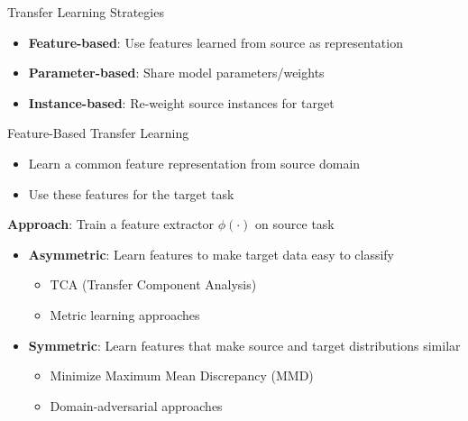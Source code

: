 \documentclass[11pt]{beamer}
\begin{document}
\begin{frame}{Transfer Learning Strategies}
    \centering
    \vfill
    \begin{itemize}
        \item \textbf{Feature-based}: Use features learned from source as representation
        \item \textbf{Parameter-based}: Share model parameters/weights
        \item \textbf{Instance-based}: Re-weight source instances for target
    \end{itemize}
\end{frame}

\begin{frame}{Feature-Based Transfer Learning}
    \begin{itemize}
        \item Learn a common feature representation from source domain
        \item Use these features for the target task
    \end{itemize}
    \vspace{0.5em}
    \textbf{Approach}: Train a feature extractor $\phi(\cdot)$ on source task
    \begin{itemize}
        \item \textbf{Asymmetric}: Learn features to make target data easy to classify
            \begin{itemize}
                \item TCA (Transfer Component Analysis)
                \item Metric learning approaches
            \end{itemize}
        \item \textbf{Symmetric}: Learn features that make source and target distributions similar
            \begin{itemize}
                \item Minimize Maximum Mean Discrepancy (MMD)
                \item Domain-adversarial approaches
            \end{itemize}
    \end{itemize}
\end{frame}
\end{document}
